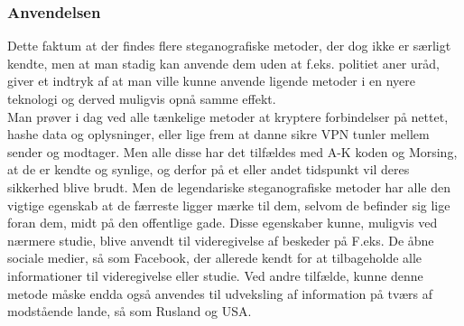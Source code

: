 \subsubsection{Anvendelsen}
Dette faktum at der findes flere steganografiske metoder, der dog ikke er særligt kendte, men at man stadig kan anvende dem uden at f.eks. politiet aner uråd, giver et indtryk af at man ville kunne anvende ligende metoder i en nyere teknologi og derved muligvis opnå samme effekt. \\
Man prøver i dag ved alle tænkelige metoder at kryptere forbindelser på nettet, hashe data og oplysninger, eller lige frem at danne sikre VPN tunler mellem sender og modtager. Men alle disse har det tilfældes med A-K koden og Morsing, at de er kendte og synlige, og derfor på et eller andet tidspunkt vil deres sikkerhed blive brudt. Men de legendariske steganografiske metoder har alle den vigtige egenskab at de færreste ligger mærke til dem, selvom de befinder sig lige foran dem, midt på den offentlige gade. Disse egenskaber kunne, muligvis ved nærmere studie, blive anvendt til videregivelse af beskeder på F.eks. De åbne sociale medier, så som Facebook, der allerede kendt for at tilbageholde alle informationer til videregivelse eller studie. Ved andre tilfælde, kunne denne metode måske endda også anvendes til udveksling af information på tværs af modstående lande, så som Rusland og USA.
